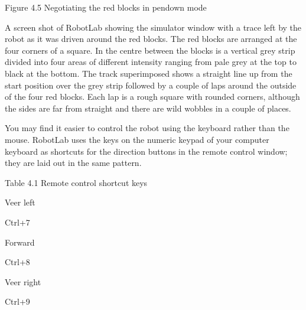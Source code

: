 \documentclass[letterpaper,10pt,english]{sphinxmanual}
\begin{document}

Figure 4.5 Negotiating the red blocks in pen\sphinxhyphen{}down mode

A screen shot of RobotLab showing the simulator window with a trace left by the robot as it was driven around the red blocks. The red blocks are arranged at the four corners of a square. In the centre between the blocks is a vertical grey strip divided into four areas of different intensity ranging from pale grey at the top to black at the bottom. The track superimposed shows a straight line up from the start position over the grey strip followed by a couple of laps around the outside of the
four red blocks. Each lap is a rough square with rounded corners, although the sides are far from straight and there are wild wobbles in a couple of places.

You may find it easier to control the robot using the keyboard rather than the mouse. RobotLab uses the keys on the numeric keypad of your computer keyboard as short\sphinxhyphen{}cuts for the direction buttons in the remote control window; they are laid out in the same pattern.





Table 4.1 Remote control short\sphinxhyphen{}cut keys










Veer left

Ctrl+7






Forward

Ctrl+8






Veer right

Ctrl+9
\end{document}
